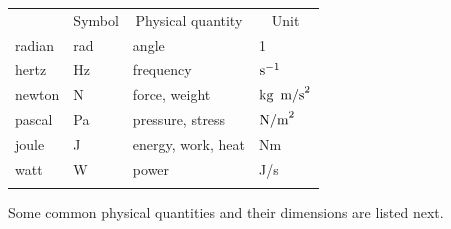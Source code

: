\documentclass[graybox,envcountchap,sectrefs,final]{svmonodo}
\begin{document}
{\small   %

\vspace{4mm}

\begin{tabular}{llll}
\hline\noalign{\smallskip}
\multicolumn{1}{c}{ Name } & \multicolumn{1}{c}{ Symbol } & \multicolumn{1}{c}{ Physical quantity } & \multicolumn{1}{c}{ Unit } \\
\noalign{\smallskip}\svhline\noalign{\smallskip}
radian & rad    & angle              & 1                   \\
hertz  & Hz     & frequency          & $\hbox{s}^{-1}$     \\
newton & N      & force, weight      & $\hbox{kg\, m/s}^2$ \\
pascal & Pa     & pressure, stress   & $\hbox{N/m}^2$      \\
joule  & J      & energy, work, heat & Nm                  \\
watt   & W      & power              & J/s                 \\
\noalign{\smallskip}\hline\noalign{\smallskip}
\end{tabular}

\vspace{4mm}

}


\noindent
Some common physical quantities and their dimensions are listed next.
\end{document}
